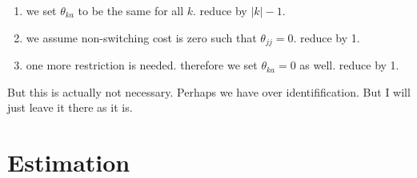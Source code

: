\documentclass[12pt]{article}[margin=1in]
\begin{document}
\begin{enumerate}
    \item we set $\theta_{ka}$ to be the same for all $k$. reduce by $|k|-1$.
    \item we assume non-switching cost is zero such that $\theta_{jj}=0$. reduce by 1.
    \item one more restriction is needed. therefore we set $\theta_{ka}=0$ as well. reduce by 1.
\end{enumerate}

But this is actually not necessary. Perhaps we have over identifification. But I will just leave it there as it is.







\section{Estimation}

\newpage

\end{document}
